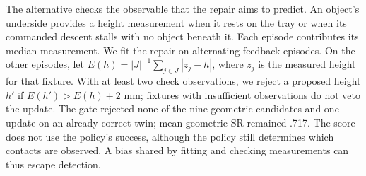 The alternative checks the observable that the repair aims to predict. An object's underside provides a height measurement when it rests on the tray or when its commanded descent stalls with no object beneath it. Each episode contributes its median measurement. We fit the repair on alternating feedback episodes. On the other episodes, let $E(h)=|J|^{-1}\sum_{j\in J}|z_j-h|$, where $z_j$ is the measured height for that fixture. With at least two check observations, we reject a proposed height $h'$ if $E(h')>E(h)+2$ mm; fixtures with insufficient observations do not veto the update. The gate rejected none of the nine geometric candidates and one update on an already correct twin; mean geometric SR remained .717. The score does not use the policy's success, although the policy still determines which contacts are observed. A bias shared by fitting and checking measurements can thus escape detection.
